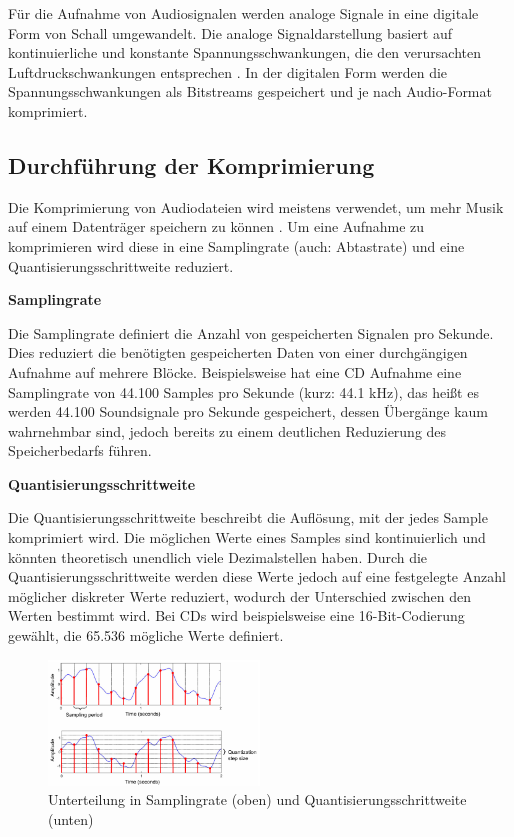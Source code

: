 Für die Aufnahme von Audiosignalen werden analoge Signale in eine digitale Form von Schall umgewandelt. Die analoge Signaldarstellung basiert auf kontinuierliche und konstante Spannungsschwankungen, die den verursachten Luftdruckschwankungen entsprechen \parencite{digital_representation}. In der digitalen Form werden die Spannungsschwankungen als Bitstreams gespeichert und je nach Audio-Format komprimiert.

%
\subsection{Durchführung der Komprimierung}
\label{compression}
%

Die Komprimierung von Audiodateien wird meistens verwendet, um mehr Musik auf einem Datenträger speichern zu können \parencite{what_is_audio_compression}. Um eine Aufnahme zu komprimieren wird diese in eine Samplingrate (auch: Abtastrate) und eine Quantisierungsschrittweite reduziert.

\par

%
\textbf{Samplingrate}
%

Die Samplingrate definiert die Anzahl von gespeicherten Signalen pro Sekunde. Dies reduziert die benötigten gespeicherten Daten von einer durchgängigen Aufnahme auf mehrere Blöcke. Beispielsweise hat eine CD Aufnahme eine Samplingrate von 44.100 Samples pro Sekunde (kurz: 44.1 kHz), das heißt es werden 44.100 Soundsignale pro Sekunde gespeichert, dessen Übergänge kaum wahrnehmbar sind, jedoch bereits zu einem deutlichen Reduzierung des Speicherbedarfs führen.

%
\textbf{Quantisierungsschrittweite}
%

Die Quantisierungsschrittweite beschreibt die Auflösung, mit der jedes Sample komprimiert wird. Die möglichen Werte eines Samples sind kontinuierlich und könnten theoretisch unendlich viele Dezimalstellen haben. Durch die Quantisierungsschrittweite werden diese Werte jedoch auf eine festgelegte Anzahl möglicher diskreter Werte reduziert, wodurch der Unterschied zwischen den Werten bestimmt wird. Bei CDs wird beispielsweise eine 16-Bit-Codierung gewählt, die 65.536 mögliche Werte definiert.

%
\begin{figure}[h]
    \includegraphics[width=0.5\textwidth]{images/Samplingrate_Quantisierungsgröße.PNG}
    \caption{Unterteilung in Samplingrate (oben) und Quantisierungsschrittweite (unten)}
    \label{fig:samplingrate}
\end{figure}
%

